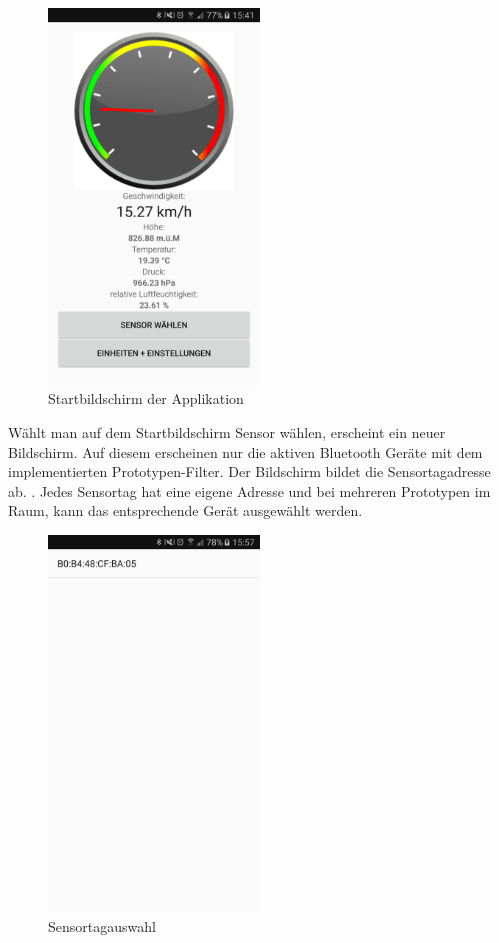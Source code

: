 \begin{figure}[ht]
    \includegraphics[width=0.5\textwidth]{4Resultate/imag/APPHomeScreen.png} 
    \caption{Startbildschirm der Applikation}
    \label{tacho}
\end{figure}

Wählt man auf dem Startbildschirm \glqq Sensor wählen\grqq,  erscheint ein neuer Bildschirm. Auf diesem erscheinen nur die aktiven Bluetooth Geräte mit dem implementierten Prototypen-Filter. Der Bildschirm bildet die Sensortagadresse ab. . Jedes Sensortag hat eine eigene Adresse und bei mehreren Prototypen im Raum, kann das entsprechende Gerät ausgewählt werden.


\begin{figure}[ht]
    \includegraphics[width=0.5\textwidth]{4Resultate/imag/BLEAdresseAuswaehlen.png} 
    \caption{Sensortagauswahl}
    \label{sensorauswahl}
\end{figure}

